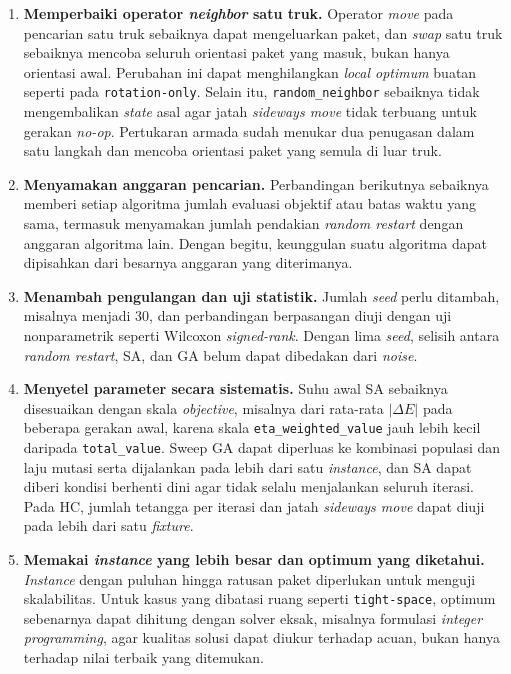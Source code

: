 \begin{enumerate}
    \item \textbf{Memperbaiki operator \textit{neighbor} satu truk.} Operator \textit{move} pada pencarian satu truk sebaiknya dapat mengeluarkan paket, dan \textit{swap} satu truk sebaiknya mencoba seluruh orientasi paket yang masuk, bukan hanya orientasi awal. Perubahan ini dapat menghilangkan \textit{local optimum} buatan seperti pada \texttt{rotation-only}. Selain itu, \texttt{random\_neighbor} sebaiknya tidak mengembalikan \textit{state} asal agar jatah \textit{sideways move} tidak terbuang untuk gerakan \textit{no-op}. Pertukaran armada sudah menukar dua penugasan dalam satu langkah dan mencoba orientasi paket yang semula di luar truk.

    \item \textbf{Menyamakan anggaran pencarian.} Perbandingan berikutnya sebaiknya memberi setiap algoritma jumlah evaluasi objektif atau batas waktu yang sama, termasuk menyamakan jumlah pendakian \textit{random restart} dengan anggaran algoritma lain. Dengan begitu, keunggulan suatu algoritma dapat dipisahkan dari besarnya anggaran yang diterimanya.

    \item \textbf{Menambah pengulangan dan uji statistik.} Jumlah \textit{seed} perlu ditambah, misalnya menjadi 30, dan perbandingan berpasangan diuji dengan uji nonparametrik seperti Wilcoxon \textit{signed-rank}. Dengan lima \textit{seed}, selisih antara \textit{random restart}, SA, dan GA belum dapat dibedakan dari \textit{noise}.

    \item \textbf{Menyetel parameter secara sistematis.} Suhu awal SA sebaiknya disesuaikan dengan skala \textit{objective}, misalnya dari rata-rata $|\Delta E|$ pada beberapa gerakan awal, karena skala \texttt{eta\_weighted\_value} jauh lebih kecil daripada \texttt{total\_value}. Sweep GA dapat diperluas ke kombinasi populasi dan laju mutasi serta dijalankan pada lebih dari satu \textit{instance}, dan SA dapat diberi kondisi berhenti dini agar tidak selalu menjalankan seluruh iterasi. Pada HC, jumlah tetangga per iterasi dan jatah \textit{sideways move} dapat diuji pada lebih dari satu \textit{fixture}.

    \item \textbf{Memakai \textit{instance} yang lebih besar dan optimum yang diketahui.} \textit{Instance} dengan puluhan hingga ratusan paket diperlukan untuk menguji skalabilitas. Untuk kasus yang dibatasi ruang seperti \texttt{tight-space}, optimum sebenarnya dapat dihitung dengan solver eksak, misalnya formulasi \textit{integer programming}, agar kualitas solusi dapat diukur terhadap acuan, bukan hanya terhadap nilai terbaik yang ditemukan.


\end{enumerate}
